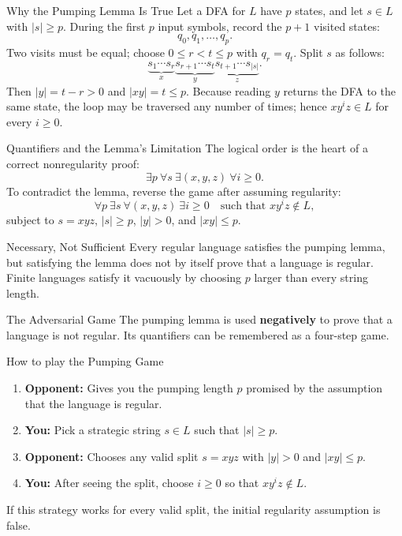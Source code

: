\documentclass[10pt]{beamer}
\begin{document}
\begin{frame}{Why the Pumping Lemma Is True}
  \small
  Let a DFA for $L$ have $p$ states, and let $s\in L$ with $|s|\geq p$.
  During the first $p$ input symbols, record the $p+1$ visited states:
  \[
    q_0,q_1,\ldots,q_p.
  \]
  Two visits must be equal; choose $0\leq r<t\leq p$ with $q_r=q_t$.
  Split $s$ as follows:
  \[
    \underbrace{s_1\cdots s_r}_{x}
    \underbrace{s_{r+1}\cdots s_t}_{y}
    \underbrace{s_{t+1}\cdots s_{|s|}}_{z}.
  \]
  Then $|y|=t-r>0$ and $|xy|=t\leq p$. Because reading $y$ returns the DFA
  to the same state, the loop may be traversed any number of times; hence
  $xy^{i}z\in L$ for every $i\geq0$.
\end{frame}

\begin{frame}{Quantifiers and the Lemma's Limitation}
  \small
  The logical order is the heart of a correct nonregularity proof:
  \[
    \exists p\ \forall s\ \exists(x,y,z)\ \forall i\geq0.
  \]
  To contradict the lemma, reverse the game after assuming regularity:
  \[
    \forall p\ \exists s\ \forall(x,y,z)\ \exists i\geq0
    \quad\text{such that }xy^{i}z\notin L,
  \]
  subject to $s=xyz$, $|s|\geq p$, $|y|>0$, and $|xy|\leq p$.
  \pause
  \begin{alertblock}{Necessary, Not Sufficient}
    Every regular language satisfies the pumping lemma, but satisfying the
    lemma does not by itself prove that a language is regular. Finite languages
    satisfy it vacuously by choosing $p$ larger than every string length.
  \end{alertblock}
\end{frame}

\begin{frame}{The Adversarial Game}
  The pumping lemma is used \textbf{negatively} to prove that a language is
  not regular. Its quantifiers can be remembered as a four-step game.
  \pause
  
  \begin{alertblock}{How to play the Pumping Game}
    \begin{enumerate}
        \item \textbf{Opponent:} Gives you the pumping length $p$ promised by
          the assumption that the language is regular.
        \pause
        \item \textbf{You:} Pick a strategic string $s \in L$ such that $|s| \geq p$.
        \pause
        \item \textbf{Opponent:} Chooses any valid split $s=xyz$ with
          $|y|>0$ and $|xy|\leq p$.
        \pause
        \item \textbf{You:} After seeing the split, choose $i\geq0$ so that
          $xy^{i}z\notin L$.
    \end{enumerate}
  \end{alertblock}
  \pause
  If this strategy works for every valid split, the initial regularity
  assumption is false.
\end{frame}
\end{document}
